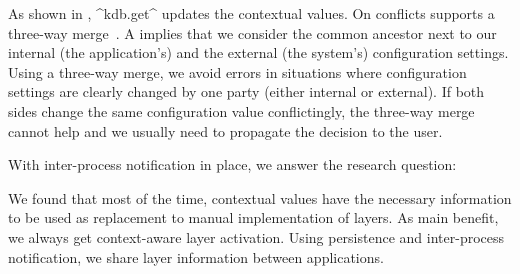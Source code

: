 \label{sec:three-way-merge}
As shown in , ^kdb.get^ updates the contextual values.
On conflicts \elektra{} supports a three-way merge~\cite{raab2016persistent}.
A  implies that we consider the common ancestor next to our internal (the application's) and the external (the system's) configuration settings.
Using a three-way merge, we avoid errors in situations where configuration settings are clearly changed by one party (either internal or external).
If both sides change the same configuration value conflictingly, the three-way merge cannot help and we usually need to propagate the decision to the user.

With inter-process notification in place, we answer the research question:
\rqFrontendUsability*

\begin{finding}
We found that most of the time, contextual values have the necessary information to be used as replacement to manual implementation of layers.
As main benefit, we always get context-aware layer activation.
Using persistence and inter-process notification, we share layer information between applications.
\end{finding}



